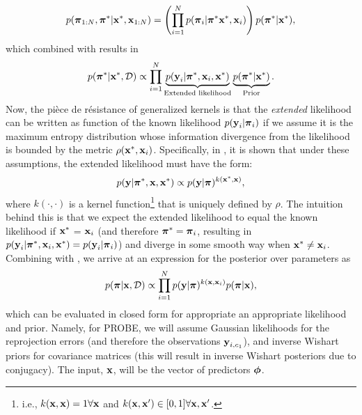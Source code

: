 \begin{equation}
 p(\boldsymbol{\mathbf{\pi}}_{1:N}, \boldsymbol{\mathbf{\pi}}^*| \boldsymbol{\mathbf{x}}^*, \boldsymbol{\mathbf{x}}_{1:N}) = \left( \prod_{i=1}^N  p(\boldsymbol{\mathbf{\pi}}_i | \boldsymbol{\mathbf{\pi}}^* \boldsymbol{\mathbf{x}}^*, \boldsymbol{\mathbf{x}}_i)  \right) p(\boldsymbol{\mathbf{\pi}}^* | \boldsymbol{\mathbf{x}}^*), 
\end{equation}
which combined with  results in
\begin{equation}
\label{eq:probe_extended_likelihood}
p(\boldsymbol{\mathbf{\pi}}^* | \boldsymbol{\mathbf{x}}^*, \mathcal{D}) \propto \prod_{i=1}^N \underbrace{p(\boldsymbol{\mathbf{y}}_i | \boldsymbol{\mathbf{\pi}}^*, \boldsymbol{\mathbf{x}}_i, \boldsymbol{\mathbf{x}}^*)}_{\text{Extended likelihood}} \underbrace{p(\boldsymbol{\mathbf{\pi}}^*|\boldsymbol{\mathbf{x}}^*)}_{\text{Prior}}.
\end{equation}
Now, the pièce de résistance of generalized kernels is that the \textit{extended} likelihood can be written as function of the known likelihood $p(\boldsymbol{\mathbf{y}}_i | \boldsymbol{\mathbf{\pi}}_i)$ if we assume it is the maximum entropy distribution whose information divergence from the likelihood is bounded by the metric $\rho(\boldsymbol{\mathbf{x}}^*, \boldsymbol{\mathbf{x}}_i)$. Specifically, in \cite{Vega-Brown2014-sb}, it is shown that under these assumptions, the extended likelihood must have the form:
\begin{equation}
\label{eq:probe_kernel_likelihood}
p(\boldsymbol{\mathbf{y}} | \boldsymbol{\mathbf{\pi}}^*, \boldsymbol{\mathbf{x}}, \boldsymbol{\mathbf{x}}^*) \propto p(\boldsymbol{\mathbf{y}} | \boldsymbol{\mathbf{\pi}})^{k(\boldsymbol{\mathbf{x}}^*, \boldsymbol{\mathbf{x}})},
\end{equation}
where $k(\cdot, \cdot)$ is a kernel function\footnote{i.e., $k(\boldsymbol{\mathbf{x}}, \boldsymbol{\mathbf{x}}) = 1 \forall \boldsymbol{\mathbf{x}}$ and $k(\boldsymbol{\mathbf{x}}, \boldsymbol{\mathbf{x}}') \in [0,1] \forall \boldsymbol{\mathbf{x}}, \boldsymbol{\mathbf{x}}'$.} that is uniquely defined by $\rho$. The intuition behind this is that we expect the extended likelihood to equal the known likelihood if $\boldsymbol{\mathbf{x}}^*$ = $\boldsymbol{\mathbf{x}}_i$ (and therefore $\boldsymbol{\mathbf{\pi}}^* = \boldsymbol{\mathbf{\pi}}_i$, resulting in $p(\boldsymbol{\mathbf{y}}_i | \boldsymbol{\mathbf{\pi}}^*, \boldsymbol{\mathbf{x}}_i, \boldsymbol{\mathbf{x}}^*) = p(\boldsymbol{\mathbf{y}}_i | \boldsymbol{\mathbf{\pi}}_i)$) and diverge in some smooth way when $\boldsymbol{\mathbf{x}}^* \neq \boldsymbol{\mathbf{x}}_i$. 
Combining  with , we arrive at an expression for the posterior over parameters as 
\begin{equation}
\label{eq:probe_posterior}
p(\boldsymbol{\mathbf{\pi}} | \boldsymbol{\mathbf{x}}, \mathcal{D}) \propto \prod_{i=1}^N p(\boldsymbol{\mathbf{y}} | \boldsymbol{\mathbf{\pi}})^{k(\boldsymbol{\mathbf{x}}, \boldsymbol{\mathbf{x}}_i)} p(\boldsymbol{\mathbf{\pi}} |\boldsymbol{\mathbf{x}}),
\end{equation}
which can be evaluated in closed form for appropriate an appropriate likelihood and prior. Namely, for PROBE, we will assume Gaussian likelihoods for the reprojection errors (and therefore the observations $\boldsymbol{\mathbf{y}}_{i, c_1}$), and inverse Wishart priors for covariance matrices (this will result in inverse Wishart posteriors due to conjugacy). The input, $\boldsymbol{\mathbf{x}}$, will be the vector of predictors $\boldsymbol{\mathbf{\phi}}$.




